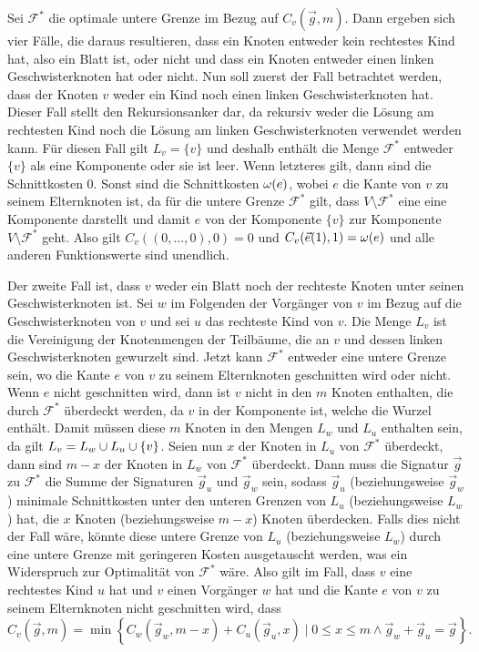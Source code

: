 Sei $\mathcal{F}^*$ die optimale untere Grenze im Bezug auf $C_v(\vec{g}, m)$. Dann ergeben sich vier Fälle, die daraus resultieren, dass ein Knoten entweder kein rechtestes Kind hat, also ein Blatt ist, oder nicht und dass ein Knoten entweder einen linken Geschwisterknoten hat oder nicht.
Nun soll zuerst der Fall betrachtet werden, dass der Knoten $v$ weder ein Kind noch einen linken Geschwisterknoten hat.
Dieser Fall stellt den Rekursionsanker dar, da rekursiv weder die Lösung am rechtesten Kind noch die Lösung am linken Geschwisterknoten verwendet werden kann.
Für diesen Fall gilt $L_v = \{v\}$ und deshalb enthält die Menge $\mathcal{F}^*$ entweder $\{v\}$ als eine Komponente oder sie ist leer.
Wenn letzteres gilt, dann sind die Schnittkosten $0$.
Sonst sind die Schnittkosten $\omega(e)$, wobei $e$ die Kante von $v$ zu seinem Elternknoten ist, da für die untere Grenze $\mathcal{F}^*$ gilt, dass $V \setminus \mathcal{F}^*$ eine eine Komponente darstellt und damit $e$ von der Komponente $\{v\}$ zur Komponente $V \setminus \mathcal{F}^*$ geht.
Also gilt $C_v((0,\ldots,0), 0) = 0$ und $C_v(\vec{e}(1), 1) = \omega(e)$ und alle anderen Funktionswerte sind unendlich.

Der zweite Fall ist, dass $v$ weder ein Blatt noch der rechteste Knoten unter seinen Geschwisterknoten ist. Sei $w$ im Folgenden der Vorgänger von $v$ im Bezug auf die Geschwisterknoten von $v$ und sei $u$ das rechteste Kind von $v$. 
Die Menge $L_v$ ist die Vereinigung der Knotenmengen der Teilbäume, die an $v$ und dessen linken Geschwisterknoten gewurzelt sind.
Jetzt kann $\mathcal{F}^*$ entweder eine untere Grenze sein, wo die Kante $e$ von $v$ zu seinem Elternknoten geschnitten wird oder nicht.
Wenn $e$ nicht geschnitten wird, dann ist $v$ nicht in den $m$ Knoten enthalten, die durch $\mathcal{F}^*$ überdeckt werden, da $v$ in der Komponente ist, welche die Wurzel enthält.
Damit müssen diese $m$ Knoten in den Mengen $L_w$ und $L_u$ enthalten sein, da gilt $L_v = L_w \cup L_u \cup \{v\}$.
Seien nun $x$ der Knoten in $L_u$ von $\mathcal{F}^*$ überdeckt, dann sind $m - x$ der Knoten in $L_w$ von $\mathcal{F}^*$ überdeckt.
Dann muss die Signatur $\vec{g}$ zu $\mathcal{F}^*$ die Summe der Signaturen $\vec{g}_u$ und $\vec{g}_w$ sein, sodass $\vec{g}_u$ (beziehungsweise $\vec{g}_w$) minimale Schnittkosten unter den unteren Grenzen von $L_u$ (beziehungsweise $L_w$) hat, die $x$ Knoten (beziehungsweise $m - x$) Knoten überdecken.
Falls dies nicht der Fall wäre, könnte diese untere Grenze von $L_u$ (beziehungsweise $L_w$) durch eine untere Grenze mit geringeren Kosten ausgetauscht werden, was ein Widerspruch zur Optimalität von $\mathcal{F}^*$ wäre.
Also gilt im Fall, dass $v$ eine rechtestes Kind $u$ hat und $v$ einen Vorgänger $w$ hat und die Kante $e$ von $v$ zu seinem Elternknoten nicht geschnitten wird, dass 
\begin{equation}\label{eq:e_not_cut}
    C_v(\vec{g}, m) = \min \left\{ C_w(\vec{g}_w, m - x) + C_u(\vec{g}_u, x) \mid 0 \leq x \leq m \land \vec{g}_w + \vec{g}_u = \vec{g} \right\}.
\end{equation}

